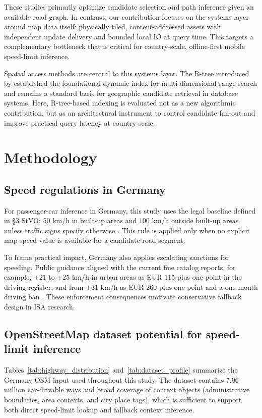 \documentclass{article}
\begin{document}
These studies primarily optimize candidate selection and path inference given an available road graph. In contrast, our contribution focuses on the systems layer around map data itself: physically tiled, content-addressed assets with independent update delivery and bounded local IO at query time. This targets a complementary bottleneck that is critical for country-scale, offline-first mobile speed-limit inference.

Spatial access methods are central to this systems layer. The R-tree introduced by \citet{guttman1984} established the foundational dynamic index for multi-dimensional range search and remains a standard basis for geographic candidate retrieval in database systems. Here, R-tree-based indexing is evaluated not as a new algorithmic contribution, but as an architectural instrument to control candidate fan-out and improve practical query latency at country scale.

\section{Methodology}

\subsection{Speed regulations in Germany}
For passenger-car inference in Germany, this study uses the legal baseline defined in \S3 StVO: \(50\) km/h in built-up areas and \(100\) km/h outside built-up areas unless traffic signs specify otherwise \cite{stvo_3}. This rule is applied only when no explicit map speed value is available for a candidate road segment.

To frame practical impact, Germany also applies escalating sanctions for speeding. Public guidance aligned with the current fine catalog reports, for example, \(+21\) to \(+25\) km/h in urban areas as EUR 115 plus one point in the driving register, and from \(+31\) km/h as EUR 260 plus one point and a one-month driving ban \cite{adac_bussgeld_2025}. These enforcement consequences motivate conservative fallback design in ISA research.


\subsection{OpenStreetMap dataset potential for speed-limit inference}
Tables~\ref{tab:highway_distribution} and~\ref{tab:dataset_profile} summarize the Germany OSM input used throughout this study. The dataset contains 7.96 million car-drivable ways and broad coverage of context objects (administrative boundaries, area contexts, and city place tags), which is sufficient to support both direct speed-limit lookup and fallback context inference.
\end{document}
